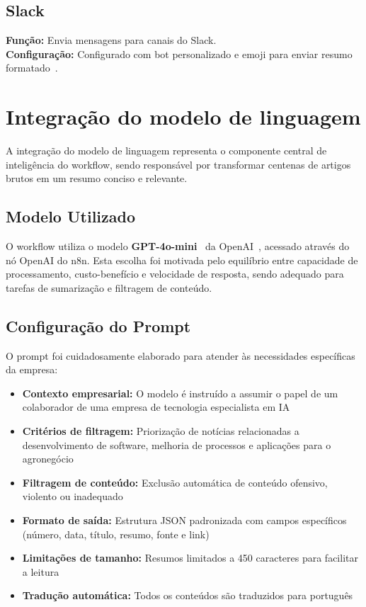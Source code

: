 \documentclass{sftex}
\begin{document}
\subsection{Slack}
\textbf{Função:} Envia mensagens para canais do Slack.\\
\textbf{Configuração:} Configurado com bot personalizado e emoji para enviar resumo formatado~\cite{n8n_slack}.

\section{Integração do modelo de linguagem}

A integração do modelo de linguagem representa o componente central de inteligência do workflow, sendo responsável por transformar centenas de artigos brutos em um resumo conciso e relevante.

\subsection{Modelo Utilizado}
O workflow utiliza o modelo \textbf{GPT-4o-mini}~\cite{openai_gpt4o_mini} da OpenAI~\cite{openai_api}, acessado através do nó OpenAI do n8n. Esta escolha foi motivada pelo equilíbrio entre capacidade de processamento, custo-benefício e velocidade de resposta, sendo adequado para tarefas de sumarização e filtragem de conteúdo.

\subsection{Configuração do Prompt}
O prompt foi cuidadosamente elaborado para atender às necessidades específicas da empresa:

\begin{itemize}
    \item \textbf{Contexto empresarial:} O modelo é instruído a assumir o papel de um colaborador de uma empresa de tecnologia especialista em IA
    \item \textbf{Critérios de filtragem:} Priorização de notícias relacionadas a desenvolvimento de software, melhoria de processos e aplicações para o agronegócio
    \item \textbf{Filtragem de conteúdo:} Exclusão automática de conteúdo ofensivo, violento ou inadequado
    \item \textbf{Formato de saída:} Estrutura JSON padronizada com campos específicos (número, data, título, resumo, fonte e link)
    \item \textbf{Limitações de tamanho:} Resumos limitados a 450 caracteres para facilitar a leitura
    \item \textbf{Tradução automática:} Todos os conteúdos são traduzidos para português
\end{itemize}
\end{document}
